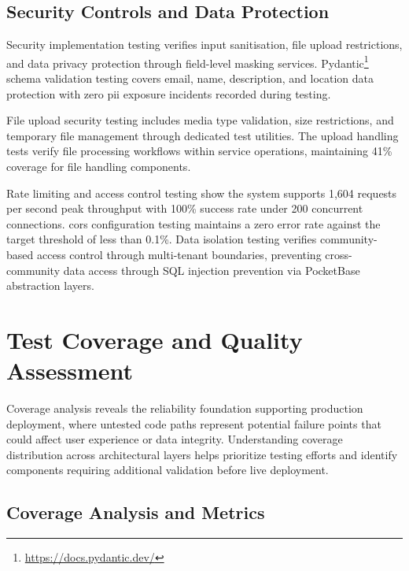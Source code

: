 \subsection{Security Controls and Data Protection} \label{subsection:security_controls}

Security implementation testing verifies input sanitisation, file upload restrictions, and data privacy protection through field-level masking services. Pydantic\footnote{\url{https://docs.pydantic.dev/}} schema validation testing covers email, name, description, and location data protection with zero \ac{pii} exposure incidents recorded during testing.

File upload security testing includes media type validation, size restrictions, and temporary file management through dedicated test utilities. The upload handling tests verify file processing workflows within service operations, maintaining 41\% coverage for file handling components.

Rate limiting and access control testing show the system supports 1,604 requests per second peak throughput with 100\% success rate under 200 concurrent connections. \ac{cors} configuration testing maintains a zero error rate against the target threshold of less than 0.1\%. Data isolation testing verifies community-based access control through multi-tenant boundaries, preventing cross-community data access through SQL injection prevention via PocketBase abstraction layers.


\section{Test Coverage and Quality Assessment} \label{section:test_coverage_quality}

Coverage analysis reveals the reliability foundation supporting production deployment, where untested code paths represent potential failure points that could affect user experience or data integrity. Understanding coverage distribution across architectural layers helps prioritize testing efforts and identify components requiring additional validation before live deployment.

\subsection{Coverage Analysis and Metrics} \label{subsection:coverage_analysis}

